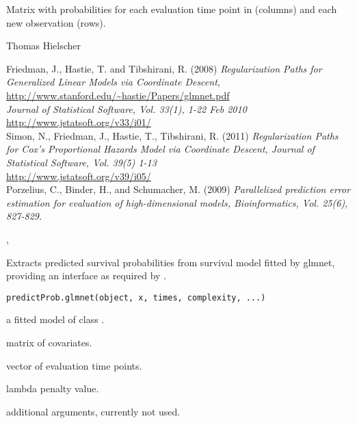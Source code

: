 \documentclass[letterpaper]{book}
\begin{document}
%
\begin{Value}
Matrix with probabilities for each evaluation time point in  (columns) and each new observation (rows). 
\end{Value}
%
\begin{Author}\relax
Thomas Hielscher \bsl{}
\end{Author}
%
\begin{References}\relax
Friedman, J., Hastie, T. and Tibshirani, R. (2008)
\emph{Regularization Paths for Generalized Linear Models via Coordinate
Descent},   \url{http://www.stanford.edu/~hastie/Papers/glmnet.pdf}\\{}
\emph{Journal of Statistical Software, Vol. 33(1), 1-22 Feb 2010}\\{}
\url{http://www.jstatsoft.org/v33/i01/}\\{}
Simon, N., Friedman, J., Hastie, T., Tibshirani, R. (2011)
\emph{Regularization Paths for Cox's Proportional Hazards Model via
Coordinate Descent, Journal of Statistical Software, Vol. 39(5)
1-13}\\{}
\url{http://www.jstatsoft.org/v39/i05/}\\{}
Porzelius, C., Binder, H., and Schumacher, M. (2009) 
\emph{Parallelized prediction error estimation for evaluation of high-dimensional models,
Bioinformatics, Vol. 25(6), 827-829.}
\end{References}
%
\begin{SeeAlso}\relax
{}, 
\end{SeeAlso}
%
\begin{Description}\relax
Extracts predicted survival probabilities from survival model fitted by glmnet, providing an interface as required by . 
\end{Description}
%
\begin{Usage}
\begin{verbatim}
predictProb.glmnet(object, x, times, complexity, ...)
\end{verbatim}
\end{Usage}
%
\begin{Arguments}
\begin{ldescription}
\item[\code{object}] a fitted model of class .
\item[\code{x}]  matrix of covariates.
\item[\code{times}] vector of evaluation time points.
\item[\code{complexity}] lambda penalty value.
\item[\code{...}] additional arguments, currently not used.
\end{ldescription}
\end{Arguments}
\end{document}
